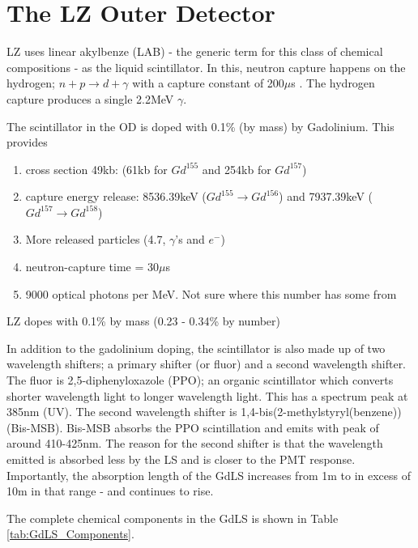 \section{The LZ Outer Detector} \label{OD_info}

\par
LZ uses linear akylbenze (LAB) - the generic term for this class of chemical compositions - as the liquid scintillator.
In this, neutron capture happens on the hydrogen; $n + p \xrightarrow{} d + \gamma$ with a capture constant of 200$\mu$s \cite{LZ_TechnicalDesignReview_ref}.
The hydrogen capture produces a single 2.2MeV $\gamma$.
\par
The scintillator in the OD is doped with 0.1\% (by mass) by Gadolinium.
This provides 

\begin{enumerate}
    \item cross section 49kb: (61kb for $Gd^{155}$ and 254kb for $Gd^{157}$)
    \item capture energy release: 8536.39keV ($Gd^{155} \xrightarrow{} Gd^{156}$) and 7937.39keV ($Gd^{157} \xrightarrow{} Gd^{158}$)
    \item More released particles (4.7, $\gamma$'s and $e^{-}$)
    \item neutron-capture time = 30$\mu$s
    \item 9000 optical photons per MeV. Not sure where this number has some from
\end{enumerate}

\par
LZ dopes with 0.1\% by mass (0.23 - 0.34\% by number)

\par
In addition to the gadolinium doping, the scintillator is also made up of two wavelength shifters; a primary shifter (or fluor) and a second wavelength shifter.
The fluor is 2,5-diphenyloxazole (PPO); an organic scintillator which converts shorter wavelength light to longer wavelength light. 
This has a spectrum peak at 385nm (UV).
The second wavelength shifter is 1,4-bis(2-methylstyryl(benzene)) (Bis-MSB). 
Bis-MSB absorbs the PPO scintillation and emits with peak of around 410-425nm.
The reason for the second shifter is that the wavelength emitted is absorbed less by the LS and is closer to the PMT response.
Importantly, the absorption length of the GdLS increases from 1m to in excess of 10m in that range - and continues to rise.

\par
The complete chemical components in the GdLS is shown in Table \ref{tab:GdLS_Components}.

